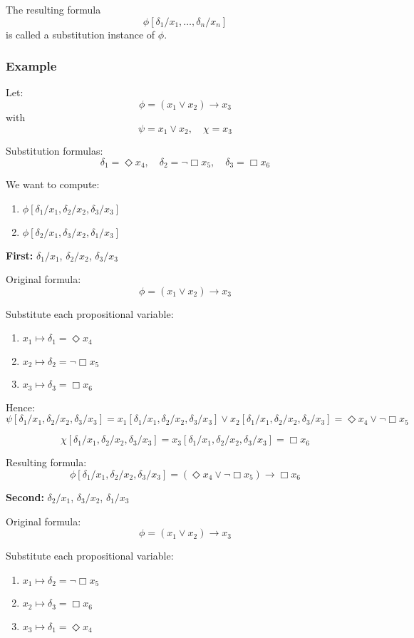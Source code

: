 \documentclass[12pt,a4paper,openany]{article}
\begin{document}
The resulting formula
$$\phi[\delta_1/x_1, \dots, \delta_n/x_n]$$
is called a substitution instance of $\phi$.

\subsubsection{Example}

Let:
$$\phi = (x_1 \lor x_2) \to x_3$$
with
$$\psi = x_1 \lor x_2, \quad \chi = x_3$$

Substitution formulas:
$$\delta_1 = \Diamond x_4, \quad \delta_2 = \neg \Box x_5, \quad \delta_3 = \Box x_6$$

We want to compute:
\begin{enumerate}
    \item $\phi[\delta_1/x_1, \delta_2/x_2, \delta_3/x_3]$
    \item $\phi[\delta_2/x_1, \delta_3/x_2, \delta_1/x_3]$
\end{enumerate}

\textbf{First:} $\delta_1/x_1$, $\delta_2/x_2$, $\delta_3/x_3$

Original formula:
$$\phi = (x_1 \lor x_2) \to x_3$$

Substitute each propositional variable:
\begin{enumerate}
    \item $x_1 \mapsto \delta_1 = \Diamond x_4$
    \item $x_2 \mapsto \delta_2 = \neg \Box x_5$
    \item $x_3 \mapsto \delta_3 = \Box x_6$
\end{enumerate}

Hence:
$$\psi[\delta_1/x_1, \delta_2/x_2, \delta_3/x_3] = x_1[\delta_1/x_1, \delta_2/x_2, \delta_3/x_3] \lor x_2[\delta_1/x_1, \delta_2/x_2, \delta_3/x_3] = \Diamond x_4 \lor \neg \Box x_5$$

$$\chi[\delta_1/x_1, \delta_2/x_2, \delta_3/x_3] = x_3[\delta_1/x_1, \delta_2/x_2, \delta_3/x_3] = \Box x_6$$

Resulting formula:
$$\phi[\delta_1/x_1, \delta_2/x_2, \delta_3/x_3] = (\Diamond x_4 \lor \neg \Box x_5) \to \Box x_6$$

\textbf{Second:} $\delta_2/x_1$, $\delta_3/x_2$, $\delta_1/x_3$

Original formula:
$$\phi = (x_1 \lor x_2) \to x_3$$

Substitute each propositional variable:
\begin{enumerate}
    \item $x_1 \mapsto \delta_2 = \neg \Box x_5$
    \item $x_2 \mapsto \delta_3 = \Box x_6$
    \item $x_3 \mapsto \delta_1 = \Diamond x_4$
\end{enumerate}
\end{document}
